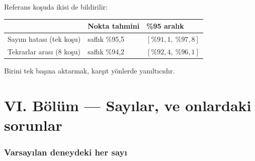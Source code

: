 \documentclass[11pt,a4paper]{article}
\begin{document}
Referans koşuda ikisi de bildirilir:

\begin{center}\small
\begin{tabular}{lll}
\toprule
& \textbf{Nokta tahmini} & \textbf{\%95 aralık} \\
\midrule
Sayım hatası (tek koşu) & saflık \%95,5 & $[\%91{,}1,\ \%97{,}8]$ \\
Tekrarlar arası (8 koşu) & saflık \%94,2 & $[\%92{,}4,\ \%96{,}1]$ \\
\bottomrule
\end{tabular}
\end{center}

Birini tek başına aktarmak, karşıt yönlerde yanıltıcıdır.

\clearpage
\part*{VI. Bölüm --- Sayılar, ve onlardaki sorunlar}

\section{Varsayılan deneydeki her sayı}
\end{document}
